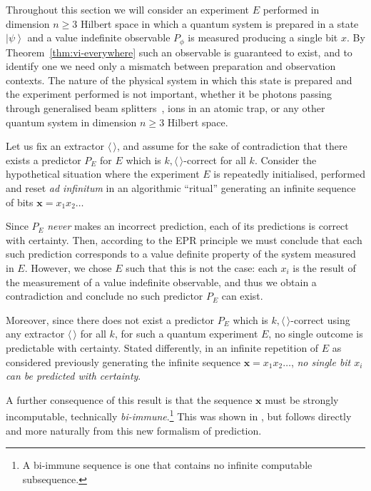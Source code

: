 \documentclass[%
 superscriptaddress,
 preprint,
 showpacs,
 showkeys,
 preprintnumbers,
  amsmath,amssymb,
  aps,
 pra,
  longbibliography,
  floatfix,
 ]{revtex4-1}
\theoremstyle{definition}
\newcommand{\x}{\mathbf{x}}
\newcommand{\ket}[1]{\left| #1 \right>}
\begin{document}
Throughout this section we will consider an experiment $E$ performed in dimension $n\ge 3$ Hilbert space in which a quantum system is prepared in a state $\ket{\psi}$ and a value indefinite observable $P_\phi$ is measured producing a single bit $x$.
By Theorem~\ref{thm:vi-everywhere} such an observable is guaranteed to exist, and to identify one we need only a mismatch between preparation and observation contexts.
The nature of the physical system in which this state is prepared and the experiment performed is not important, whether it be photons passing through generalised beam splitters~\cite{rzbb},
ions in an atomic trap, or any other quantum system in dimension $n\ge 3$ Hilbert space.

Let us fix an extractor $\langle\,  \rangle$, and
assume for the sake of contradiction that there exists a predictor $P_E$ for $E$ which is $k,\langle \, \rangle$-correct for all $k$.
Consider the hypothetical situation where the experiment $E$ is repeatedly initialised, performed and reset \emph{ad infinitum} in an algorithmic ``ritual'' generating an infinite sequence of bits $\x=x_1x_2\dots$

Since $P_E$ \emph{never} makes an incorrect prediction, each of its predictions is correct with certainty.
Then, according to the EPR principle we must conclude that each such prediction corresponds to a value definite property of the system measured in $E$.
However, we chose $E$ such that this is not the case: each $x_i$ is the result of the measurement of a value indefinite observable, and thus we obtain a contradiction and conclude no such predictor $P_E$ can exist.

Moreover, since there does not exist a predictor $P_E$ which is $k,\langle \, \rangle$-correct using any extractor $\langle\, \rangle$ for all $k$, for such a quantum experiment $E$, no single outcome is predictable with certainty.
Stated differently, in an infinite repetition of $E$ as considered previously generating the infinite sequence $\x=x_1x_2\dots$, \emph{no single bit $x_i$ can be predicted with certainty}.

A further consequence of this result is that the sequence $\x$ must be strongly incomputable, technically {\em bi-immune}.\footnote{A bi-immune sequence is one that contains no infinite computable subsequence.}
This was shown in \cite{svozil-2006-ran,2012-incomput-proofsCJ}, but follows directly and more naturally from this new formalism of prediction.
\end{document}
